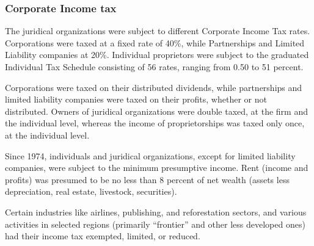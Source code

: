 \documentclass[
  12pt]{article}
\theoremstyle{definition}
\theoremstyle{remark}
\begin{document}
\subsubsection{Corporate Income tax}\label{corporate-income-tax}

The juridical organizations were subject to different Corporate Income
Tax rates. Corporations were taxed at a fixed rate of 40\%, while
Partnerships and Limited Liability companies at 20\%. Individual
proprietors were subject to the graduated Individual Tax Schedule
consisting of 56 rates, ranging from 0.50 to 51 percent.

Corporations were taxed on their distributed dividends, while
partnerships and limited liability companies were taxed on their
profits, whether or not distributed. Owners of juridical organizations
were double taxed, at the firm and the individual level, whereas the
income of proprietorships was taxed only once, at the individual level.

Since 1974, individuals and juridical organizations, except for limited
liability companies, were subject to the minimum presumptive income.
Rent (income and profits) was presumed to be no less than 8 percent of
net wealth (assets less depreciation, real estate, livestock,
securities).

Certain industries like airlines, publishing, and reforestation sectors,
and various activities in selected regions (primarily ``frontier'' and
other less developed ones) had their income tax exempted, limited, or
reduced.
\end{document}
